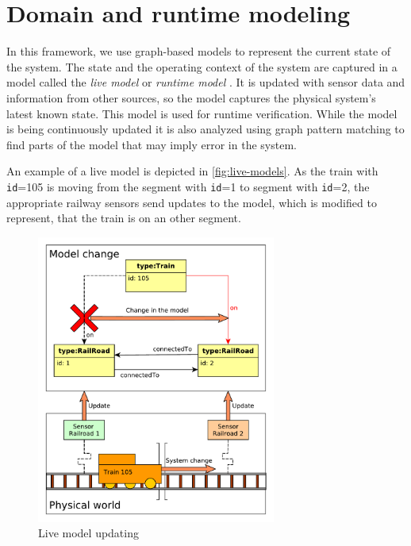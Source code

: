 \section{Domain and runtime modeling}

In this framework, we use graph-based models to represent the current state of the system. 
The state and the operating context of the system are captured in a model called the \emph{live model} or \emph{runtime model} \cite{Szvetits2013, DBLP:journals/computer/BlairBF09}.
It is updated with sensor data and information from other sources, so the model captures the physical system's latest known state.
This model is used for runtime verification.
While the model is being continuously updated it is also analyzed using graph pattern matching to find parts of the model that may imply error in the system.

An example of a live model is depicted in \autoref{fig:live-models}. As the train with \texttt{id}=105 is moving from the segment with \texttt{id}=1 to segment with \texttt{id}=2, the appropriate railway sensors send updates to the model, which is modified to represent, that the train is on an other segment.




\begin{figure}[H]
	\begin{center}
		\includegraphics[width=0.7\textwidth]{figures/live-models.pdf}
		\caption{Live model updating}
		\label{fig:live-models}
	\end{center}
\end{figure}

